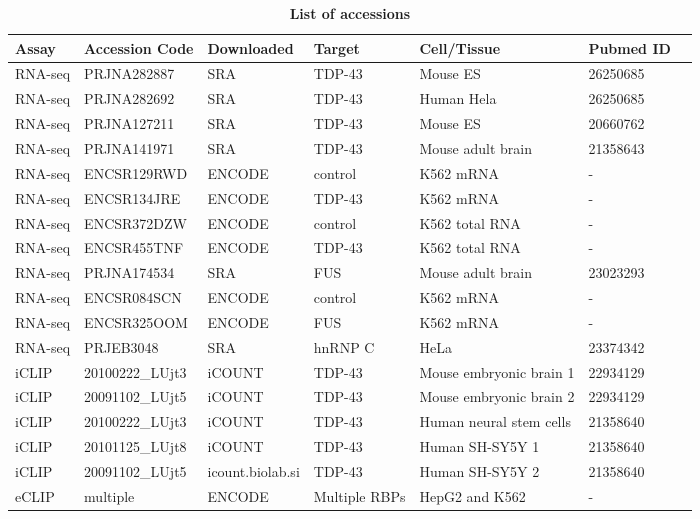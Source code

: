 	
\begin{table}[h!]
	\caption{\textbf{List of accessions}}
	\begin{footnotesize}
		\begin{tabular}{lllllll}
			Assay & Accession Code & Downloaded & Target & Cell/Tissue & Pubmed ID\\
			\hline
			RNA-seq & PRJNA282887 & SRA\footnotemark & TDP-43 & Mouse ES  & 26250685 \\
			RNA-seq & PRJNA282692 & SRA & TDP-43 & Human Hela & 26250685 \\
			RNA-seq & PRJNA127211 & SRA & TDP-43 & Mouse ES & 20660762\\
			RNA-seq & PRJNA141971 & SRA & TDP-43 & Mouse adult brain & 21358643 \\
			RNA-seq & ENCSR129RWD & ENCODE\footnotemark & control & K562 mRNA & -\\
			RNA-seq & ENCSR134JRE & ENCODE & TDP-43 & K562 mRNA & -\\
			RNA-seq & ENCSR372DZW & ENCODE & control & K562 total RNA & -\\
			RNA-seq & ENCSR455TNF & ENCODE & TDP-43 & K562 total RNA & -\\
			RNA-seq & PRJNA174534 & SRA & FUS & Mouse adult brain & 23023293 \\
			RNA-seq & ENCSR084SCN & ENCODE & control & K562 mRNA & -\\
			RNA-seq & ENCSR325OOM & ENCODE & FUS & K562 mRNA & -\\
			RNA-seq & PRJEB3048 & SRA & hnRNP C & HeLa & 23374342 \\
			iCLIP & 20100222\_LUjt3 & iCOUNT\footnotemark & TDP-43 & Mouse embryonic brain 1 & 22934129\\
			iCLIP & 20091102\_LUjt5	& iCOUNT & TDP-43 & Mouse embryonic brain 2 & 22934129\\
			iCLIP & 20100222\_LUjt3 & iCOUNT & TDP-43 & Human neural stem cells & 21358640\\
			iCLIP & 20101125\_LUjt8 & iCOUNT & TDP-43 & Human SH-SY5Y 1 & 21358640\\
			iCLIP & 20091102\_LUjt5 & icount.biolab.si & TDP-43 & Human SH-SY5Y 2 & 21358640\\
			eCLIP & multiple & ENCODE & Multiple RBPs & HepG2 and K562 & -
		\end{tabular}
	\end{footnotesize}
\end{table}

